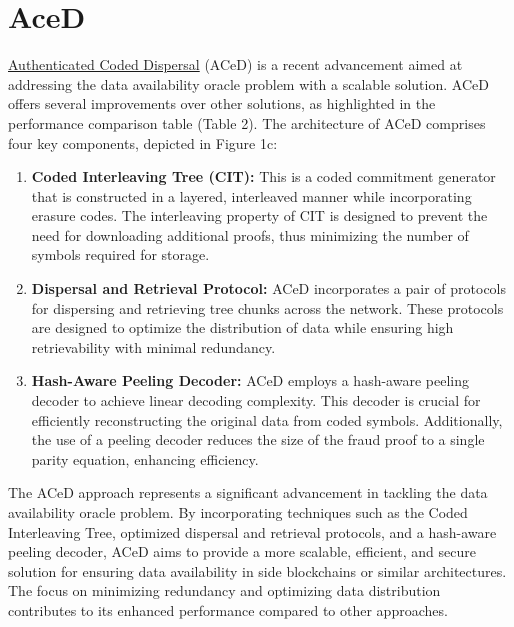 \section{AceD}
\href{https://arxiv.org/abs/2011.00102}{Authenticated Coded Dispersal} (ACeD) is a recent advancement aimed at addressing the data availability oracle problem with a scalable solution. ACeD offers several improvements over other solutions, as highlighted in the performance comparison table (Table 2). The architecture of ACeD comprises four key components, depicted in Figure 1c:
\begin{enumerate}
	\item \textbf{Coded Interleaving Tree (CIT):} This is a coded commitment generator that is constructed in a layered, interleaved manner while incorporating erasure codes. The interleaving property of CIT is designed to prevent the need for downloading additional proofs, thus minimizing the number of symbols required for storage.
	\item \textbf{Dispersal and Retrieval Protocol:} ACeD incorporates a pair of protocols for dispersing and retrieving tree chunks across the network. These protocols are designed to optimize the distribution of data while ensuring high retrievability with minimal redundancy.
	\item \textbf{Hash-Aware Peeling Decoder:} ACeD employs a hash-aware peeling decoder to achieve linear decoding complexity. This decoder is crucial for efficiently reconstructing the original data from coded symbols. Additionally, the use of a peeling decoder reduces the size of the fraud proof to a single parity equation, enhancing efficiency.
\end{enumerate}
The ACeD approach represents a significant advancement in tackling the data availability oracle problem. By incorporating techniques such as the Coded Interleaving Tree, optimized dispersal and retrieval protocols, and a hash-aware peeling decoder, ACeD aims to provide a more scalable, efficient, and secure solution for ensuring data availability in side blockchains or similar architectures. The focus on minimizing redundancy and optimizing data distribution contributes to its enhanced performance compared to other approaches.
